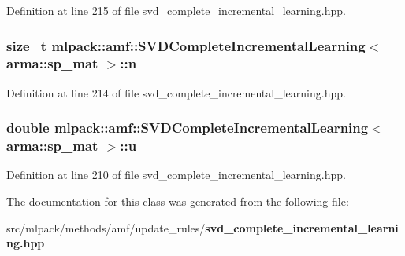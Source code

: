 Definition at line 215 of file svd\-\_\-complete\-\_\-incremental\-\_\-learning.\-hpp.

\subsubsection[{n}]{\setlength{\rightskip}{0pt plus 5cm}size\-\_\-t {\bf mlpack\-::amf\-::\-S\-V\-D\-Complete\-Incremental\-Learning}$<$ arma\-::sp\-\_\-mat $>$\-::n\hspace{0.3cm}{\ttfamily [private]}}\label{classmlpack_1_1amf_1_1SVDCompleteIncrementalLearning_3_01arma_1_1sp__mat_01_4_ac69987ebb120eed50b1976b462971ae6}


Definition at line 214 of file svd\-\_\-complete\-\_\-incremental\-\_\-learning.\-hpp.

\subsubsection[{u}]{\setlength{\rightskip}{0pt plus 5cm}double {\bf mlpack\-::amf\-::\-S\-V\-D\-Complete\-Incremental\-Learning}$<$ arma\-::sp\-\_\-mat $>$\-::u\hspace{0.3cm}{\ttfamily [private]}}\label{classmlpack_1_1amf_1_1SVDCompleteIncrementalLearning_3_01arma_1_1sp__mat_01_4_a17f68610d563b1d31a9b912b4cb3aead}


Definition at line 210 of file svd\-\_\-complete\-\_\-incremental\-\_\-learning.\-hpp.



The documentation for this class was generated from the following file\-:\begin{DoxyCompactItemize}
\item 
src/mlpack/methods/amf/update\-\_\-rules/{\bf svd\-\_\-complete\-\_\-incremental\-\_\-learning.\-hpp}\end{DoxyCompactItemize}
